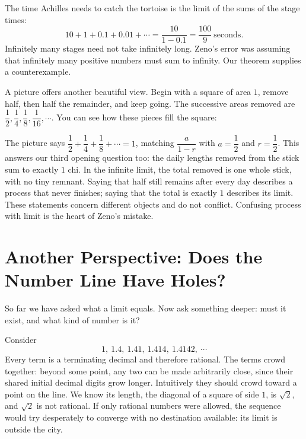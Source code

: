 \begin{tuilun}
The time Achilles needs to catch the tortoise is the limit of the sums of the stage times:
\[
10+1+0.1+0.01+\cdots=\frac{10}{1-0.1}=\frac{100}{9}\ \text{seconds}.
\]
Infinitely many stages need not take infinitely long. Zeno's error was assuming that infinitely many positive numbers must sum to infinity. Our theorem supplies a counterexample.
\end{tuilun}

A picture offers another beautiful view. Begin with a square of area $1$, remove half, then half the remainder, and keep going. The successive areas removed are $\dfrac{1}{2},\dfrac{1}{4},\dfrac{1}{8},\dfrac{1}{16},\cdots$. You can see how these pieces fill the square:

\begin{center}
\end{center}

The picture says $\dfrac{1}{2}+\dfrac{1}{4}+\dfrac{1}{8}+\cdots=1$, matching $\dfrac{a}{1-r}$ with $a=\dfrac{1}{2}$ and $r=\dfrac{1}{2}$. This answers our third opening question too: the daily lengths removed from the stick sum to exactly $1$ chi. In the infinite limit, the total removed is one whole stick, with no tiny remnant. Saying that half still remains after every day describes a process that never finishes; saying that the total is exactly $1$ describes its limit. These statements concern different objects and do not conflict. Confusing process with limit is the heart of Zeno's mistake.

\section{Another Perspective: Does the Number Line Have Holes?}

So far we have asked what a limit equals. Now ask something deeper: must it exist, and what kind of number is it?

Consider
\[
1,\ 1.4,\ 1.41,\ 1.414,\ 1.4142,\ \cdots
\]
Every term is a terminating decimal and therefore rational. The terms crowd together: beyond some point, any two can be made arbitrarily close, since their shared initial decimal digits grow longer. Intuitively they should crowd toward a point on the line. We know its length, the diagonal of a square of side $1$, is $\sqrt{2}$, and $\sqrt{2}$ is not rational. If only rational numbers were allowed, the sequence would try desperately to converge with no destination available: its limit is outside the city.

